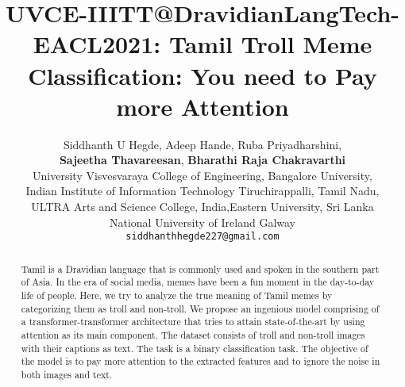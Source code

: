 \documentclass[11pt,a4paper]{article}
\title{UVCE-IIITT@DravidianLangTech-EACL2021: Tamil Troll Meme Classification: You need to Pay more Attention}
\author{Siddhanth U Hegde, Adeep Hande, Ruba Priyadharshini, \\\textbf{Sajeetha Thavareesan}, \textbf{Bharathi Raja Chakravarthi} \\   University Visvesvaraya College of Engineering, Bangalore University, \\  Indian Institute of Information Technology Tiruchirappalli, Tamil Nadu, \\ ULTRA Arts and Science College, India,Eastern University, Sri Lanka\\  National University of Ireland Galway \\   {\tt siddhanthhegde227@gmail.com}}
\date{}
\begin{document}
\maketitle
\begin{abstract}
 Tamil is a Dravidian language that is commonly used and spoken in the southern part of Asia. In the era of social media, memes have been a fun moment in the day-to-day life of people. Here, we try to analyze the true meaning of Tamil memes by categorizing them as troll and non-troll. We propose an ingenious model comprising of a transformer-transformer architecture that tries to attain state-of-the-art by using attention as its main component. The dataset consists of troll and non-troll images with their captions as text. The task is a binary classification task. The objective of the model is to pay more attention to the extracted features and to ignore the noise in both images and text.
\end{abstract}
 
\end{document}
